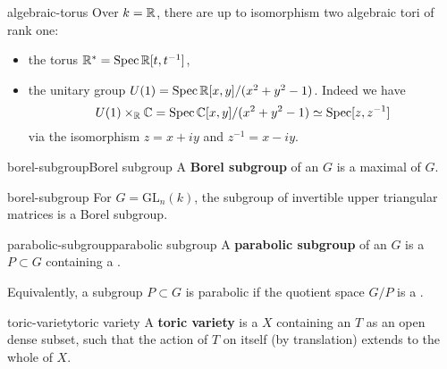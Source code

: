 \begin{example}{algebraic-torus}
    Over $k = \mathbb{R}$, there are up to isomorphism two algebraic tori of rank one:
    \begin{itemize}
        \item the torus $\mathbb{R}^* = \operatorname{Spec} \mathbb{R}[t, t^{-1}]$,
        \item the unitary group $U(1) = \operatorname{Spec} \mathbb{R}[x, y] / (x^2 + y^2 - 1)$. Indeed we have
        \[ U(1) \times_{\mathbb{R}} \mathbb{C} = \operatorname{Spec} \mathbb{C}[x, y] / (x^2 + y^2 - 1) \simeq \operatorname{Spec}[z, z^{-1}] \]
        via the isomorphism $z = x + iy$ and $z^{-1} = x - iy$.
    \end{itemize}
\end{example}

\begin{topic}{borel-subgroup}{Borel subgroup}
    A \textbf{Borel subgroup} of an  $G$ is a maximal     of $G$.
\end{topic}

\begin{example}{borel-subgroup}
    For $G = \text{GL}_n(k)$, the subgroup of invertible upper triangular matrices is a Borel subgroup.
\end{example}


\begin{topic}{parabolic-subgroup}{parabolic subgroup}
    A \textbf{parabolic subgroup} of an  $G$ is a  $P \subset G$ containing a .
    
    Equivalently, a subgroup $P \subset G$ is parabolic if the quotient space $G/P$ is a .
\end{topic}

\begin{topic}{toric-variety}{toric variety}
    A \textbf{toric variety} is a  $X$ containing an  $T$ as an open dense subset, such that the action of $T$ on itself (by translation) extends to the whole of $X$.
\end{topic}

